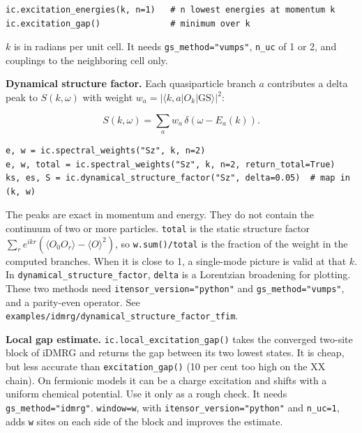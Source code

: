 \documentclass[11pt]{article}
\begin{document}
\begin{lstlisting}
ic.excitation_energies(k, n=1)   # n lowest energies at momentum k
ic.excitation_gap()              # minimum over k
\end{lstlisting}

\(k\) is in radians per unit cell. It needs \texttt{gs\_\allowbreak{}method="vumps"}, \texttt{n\_\allowbreak{}uc} of
1 or 2, and couplings to the neighboring cell only.

\textbf{Dynamical structure factor.} Each quasiparticle branch \(a\) contributes
a delta peak to \(S(k,\omega)\) with weight
\(w_a=|\langle k,a|O_k|\mathrm{GS}\rangle|^2\):

\[S(k,\omega)=\sum_aw_a\,\delta(\omega-E_a(k)).\]

\begin{lstlisting}
e, w = ic.spectral_weights("Sz", k, n=2)
e, w, total = ic.spectral_weights("Sz", k, n=2, return_total=True)
ks, es, S = ic.dynamical_structure_factor("Sz", delta=0.05)  # map in (k, w)
\end{lstlisting}

The peaks are exact in momentum and energy. They do not contain the
continuum of two or more particles. \texttt{total} is the static structure
factor \(\sum_re^{ikr}(\langle O_0O_r\rangle-\langle O\rangle^2)\), so
\texttt{w.\allowbreak{}sum()/total} is the fraction of the weight in the computed branches.
When it is close to 1, a single-mode picture is valid at that \(k\). In
\texttt{dynamical\_\allowbreak{}structure\_\allowbreak{}factor}, \texttt{delta} is a Lorentzian broadening for
plotting. These two methods need \texttt{itensor\_\allowbreak{}version="python"} and
\texttt{gs\_\allowbreak{}method="vumps"}, and a parity-even operator. See
\texttt{examples/idmrg/dynamical\_\allowbreak{}structure\_\allowbreak{}factor\_\allowbreak{}tfim}.

\textbf{Local gap estimate.} \texttt{ic.\allowbreak{}local\_\allowbreak{}excitation\_\allowbreak{}gap()} takes the converged
two-site block of iDMRG and returns the gap between its two lowest
states. It is cheap, but less accurate than \texttt{excitation\_\allowbreak{}gap()} (10 per
cent too high on the XX chain). On fermionic models it can be a charge
excitation and shifts with a uniform chemical potential. Use it only as a
rough check. It needs \texttt{gs\_\allowbreak{}method="idmrg"}. \texttt{window=w}, with
\texttt{itensor\_\allowbreak{}version="python"} and \texttt{n\_\allowbreak{}uc=1}, adds \texttt{w} sites on each side of
the block and improves the estimate.
\end{document}
